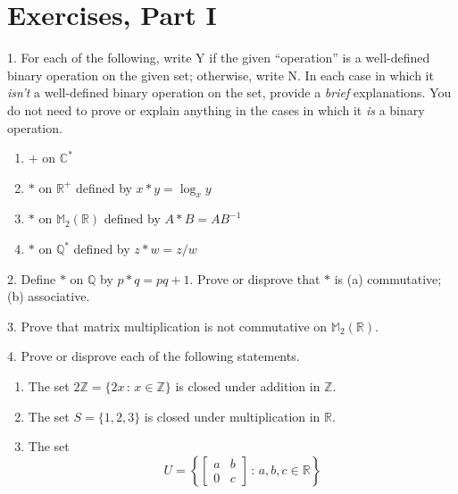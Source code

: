 \documentclass[10pt,]{book}
\theoremstyle{plain}
\theoremstyle{definition}
\theoremstyle{definition}
\theoremstyle{definition}
\theoremstyle{definition}
\numberwithin{equation}{section}
\def\Z{\mathbb{Z}}
\def\R{\mathbb{R}}
\def\Q{\mathbb{Q}}
\def\C{\mathbb{C}}
\def\M{\mathbb{M}}
\newcommand{\amp}{&}
\begin{document}
\section[{Exercises, Part I}]{Exercises, Part I}\label{exercises-2}
\begin{exerciselist}
\item[1.]\hypertarget{exercise-7}{}For each of the following, write Y if the given ``operation'' is a well-defined binary operation on the given set; otherwise, write N. In each case in which it \emph{isn't} a well-defined binary operation on the set, provide a \emph{brief} explanations. You do not need to prove or explain anything in the cases in which it \emph{is} a binary operation. \leavevmode%
\begin{enumerate}[label=(\alph*)]
\item\hypertarget{li-58}{}\(+\) on \(\C^*\)%
\item\hypertarget{li-59}{}\(*\) on \(\R^+\) defined by \(x*y=\log_x y\)%
\item\hypertarget{li-60}{}\(*\) on \(\M_2(\R)\) defined by \(A*B=AB^{-1}\)%
\item\hypertarget{li-61}{}\(*\) on \(\Q^*\) defined by \(z*w=z/w\)%
\end{enumerate}
%
\par\smallskip
\item[2.]\hypertarget{exercise-8}{}Define \(*\) on \(\Q\) by \(p*q=pq+1\). Prove or disprove that \(*\) is (a) commutative; (b) associative.%
\par\smallskip
\item[3.]\hypertarget{exercise-9}{}Prove that matrix multiplication is not commutative on \(\M_2(\R)\).%
\par\smallskip
\item[4.]\hypertarget{exercise-10}{}Prove or disprove each of the following statements. \leavevmode%
\begin{enumerate}[label=(\alph*)]
\item\hypertarget{li-68}{}The set \(2\Z=\{2x\,:\,x\in \Z\}\) is closed under addition in \(\Z\).%
\item\hypertarget{li-69}{}The set \(S=\{1,2,3\}\) is closed under multiplication in \(\R\).%
\item\hypertarget{li-70}{}The set%
\begin{equation*}
U=\left\{
\begin{bmatrix}
a    \amp    b\\
0 \amp c \end{bmatrix}\,:\,a,b,c\in \R\right\}

\end{equation*}
\end{enumerate}
\end{exerciselist}
\end{document}
